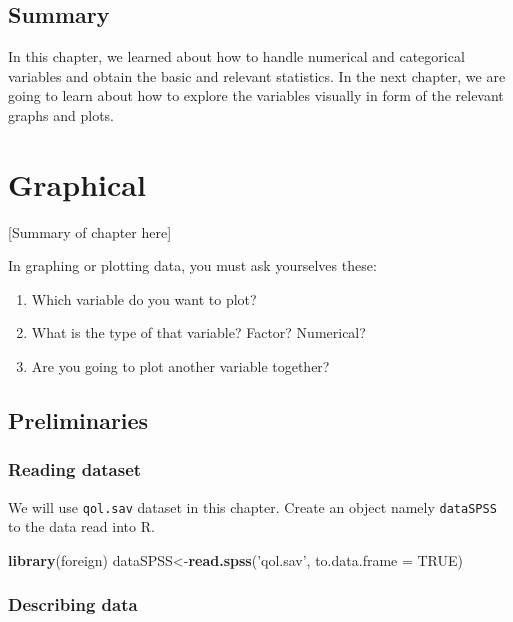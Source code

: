 \documentclass[]{book}
\newenvironment{Shaded}{\begin{snugshade}}{\end{snugshade}}
\newcommand{\KeywordTok}[1]{\textcolor[rgb]{0.13,0.29,0.53}{\textbf{{#1}}}}
\newcommand{\DataTypeTok}[1]{\textcolor[rgb]{0.13,0.29,0.53}{{#1}}}
\newcommand{\StringTok}[1]{\textcolor[rgb]{0.31,0.60,0.02}{{#1}}}
\newcommand{\OtherTok}[1]{\textcolor[rgb]{0.56,0.35,0.01}{{#1}}}
\newcommand{\NormalTok}[1]{{#1}}
\providecommand{\tightlist}{%
  \setlength{\itemsep}{0pt}\setlength{\parskip}{0pt}}
\theoremstyle{definition}
\theoremstyle{definition}
\theoremstyle{remark}
\begin{document}
\section{Summary}\label{summary-1}

In this chapter, we learned about how to handle numerical and
categorical variables and obtain the basic and relevant statistics. In
the next chapter, we are going to learn about how to explore the
variables visually in form of the relevant graphs and plots.

\chapter{Graphical}\label{graphical}

{[}Summary of chapter here{]}

In graphing or plotting data, you must ask yourselves these:

\begin{enumerate}
\def\labelenumi{\arabic{enumi}.}
\tightlist
\item
  Which variable do you want to plot?
\item
  What is the type of that variable? Factor? Numerical?
\item
  Are you going to plot another variable together?
\end{enumerate}

\section{Preliminaries}\label{preliminaries}

\subsection{Reading dataset}\label{reading-dataset}

We will use \texttt{qol.sav} dataset in this chapter. Create an object
namely \texttt{dataSPSS} to the data read into R.

\begin{Shaded}
\begin{Highlighting}[]
\KeywordTok{library}\NormalTok{(foreign)}
\NormalTok{dataSPSS<-}\KeywordTok{read.spss}\NormalTok{(}\StringTok{'qol.sav'}\NormalTok{, }\DataTypeTok{to.data.frame =} \OtherTok{TRUE}\NormalTok{)}
\end{Highlighting}
\end{Shaded}

\subsection{Describing data}\label{describing-data}
\end{document}
